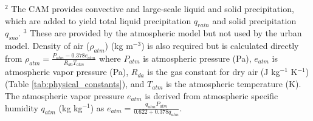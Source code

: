 \documentclass[12pt,authoryear]{elsarticle}
\numberwithin{equation}{section} %
\begin{document}
\begin{table}[H]
{$^{2}$ The CAM provides convective and large-scale liquid and solid precipitation, which are added to yield total liquid precipitation $q_{rain}$ and solid precipitation $q_{sno}$. $^3$ These are provided by the atmospheric model but not used by the urban model. Density of air ($\rho_{atm}$) (kg m$^{-3}$) is also required but is calculated directly from $\rho_{atm}=\frac{P_{atm}-0.378 e_{atm}}{R_{da}T_{atm}}$ where $P_{atm}$ is atmospheric pressure (Pa), $e_{atm}$ is atmospheric vapor pressure (Pa), $R_{da}$ is the gas constant for dry air (J kg$^{-1}$ K$^{-1}$) (Table \ref{tab:physical_constants}), and $T_{atm}$ is the atmospheric temperature (K). The atmospheric vapor pressure $e_{atm}$ is derived from atmospheric specific humidity $q_{atm}$ (kg kg$^{-1}$) as $e_{atm}=\frac{q_{atm}P_{atm}}{0.622+0.378q_{atm}}$.}
\end{table}
\end{document}

